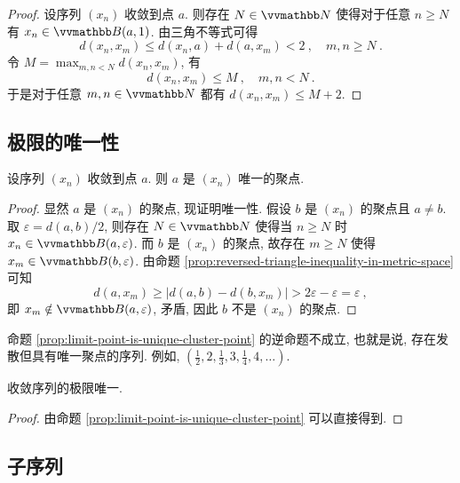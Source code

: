 \begin{proof}
    设序列 \((x_n)\) 收敛到点 \(a\). 则存在 \(N \in \N\) 使得对于任意 \(n \geq N\) 有 \(x_n \in \B(a, 1)\). 由三角不等式可得
    \[
        d(x_n, x_m) \leq d(x_n, a) + d(a, x_m) < 2\ ,\quad m, n \geq N\ .
    \]
    令 \(M = \max_{m, n < N} d(x_n, x_m)\), 有
    \[
        d(x_n, x_m) \leq M\ ,\quad m, n < N\ .
    \]
    于是对于任意 \(m, n \in \N\) 都有 \(d(x_n, x_m) \leq M + 2\).
\end{proof}

\subsection{极限的唯一性}

\begin{proposition}\label{prop:limit-point-is-unique-cluster-point}
    设序列 \((x_n)\) 收敛到点 \(a\). 则 \(a\) 是 \((x_n)\) 唯一的聚点.
\end{proposition}

\begin{proof}
    显然 \(a\) 是 \((x_n)\) 的聚点, 现证明唯一性. 假设 \(b\) 是 \((x_n)\) 的聚点且 \(a \neq b\). 取 \(\varepsilon = d(a, b) / 2\), 则存在 \(N \in \N\) 使得当 \(n \geq N\) 时 \(x_n \in \B(a, \varepsilon)\). 而 \(b\) 是 \((x_n)\) 的聚点, 故存在 \(m \geq N\) 使得 \(x_m \in \B(b, \varepsilon)\). 由命题 \ref{prop:reversed-triangle-inequality-in-metric-space} 可知
    \[
        d(a, x_m) \geq |d(a, b) - d(b, x_m)| > 2 \varepsilon - \varepsilon = \varepsilon\ ,
    \]
    即 \(x_m \notin \B(a, \varepsilon)\), 矛盾, 因此 \(b\) 不是 \((x_n)\) 的聚点.
\end{proof}

\begin{remark}
    命题 \ref{prop:limit-point-is-unique-cluster-point} 的逆命题不成立, 也就是说, 存在发散但具有唯一聚点的序列. 例如, \((\frac{1}{2}, 2, \frac{1}{3}, 3, \frac{1}{4}, 4, \ldots)\).
\end{remark}

\begin{corollary}[唯一性]
    收敛序列的极限唯一.
\end{corollary}

\begin{proof}
    由命题 \ref{prop:limit-point-is-unique-cluster-point} 可以直接得到.
\end{proof}

\subsection{子序列}

